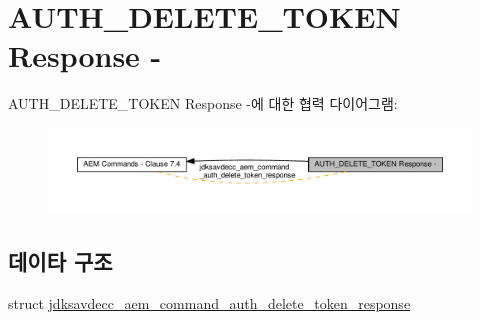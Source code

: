 \hypertarget{group__command__auth__delete__token__response}{}\section{A\+U\+T\+H\+\_\+\+D\+E\+L\+E\+T\+E\+\_\+\+T\+O\+K\+EN Response -\/}
\label{group__command__auth__delete__token__response}
A\+U\+T\+H\+\_\+\+D\+E\+L\+E\+T\+E\+\_\+\+T\+O\+K\+EN Response -\/에 대한 협력 다이어그램\+:
\nopagebreak
\begin{figure}[H]
\begin{center}
\leavevmode
\includegraphics[width=350pt]{group__command__auth__delete__token__response}
\end{center}
\end{figure}
\subsection*{데이타 구조}
\begin{DoxyCompactItemize}
\item 
struct \hyperlink{structjdksavdecc__aem__command__auth__delete__token__response}{jdksavdecc\+\_\+aem\+\_\+command\+\_\+auth\+\_\+delete\+\_\+token\+\_\+response}
\end{DoxyCompactItemize}
